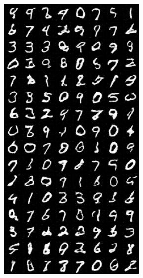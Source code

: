 \begin{figure}[H]
\begin{subfigure}{0.2\textwidth}
        \includegraphics[width=0.95\linewidth]{nz/nz100_fake_sample_epoch_0010.png}
        \caption{}
        \label{subfig:nz100}
    \end{subfigure}%
    \begin{subfigure}{0.2\textwidth}
        \centering

\end{subfigure}
\end{figure}
